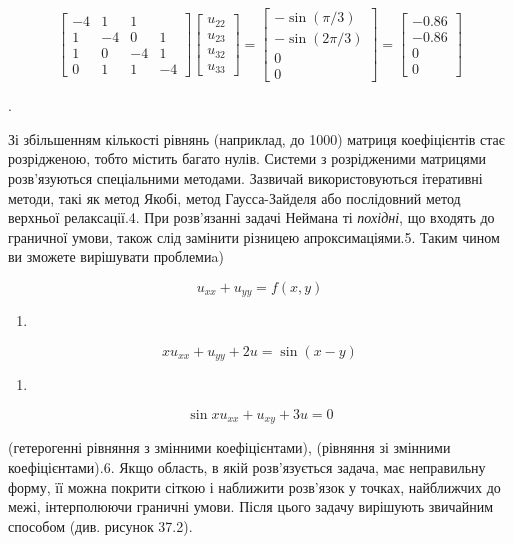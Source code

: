 \documentclass[
  ukrainian,
]{article}
\providecommand{\tightlist}{%
  \setlength{\itemsep}{0pt}\setlength{\parskip}{0pt}}
\begin{document}
\[
\begin{bmatrix} -4 & 1 & 1 \\ 1 & -4 & 0 & 1 \\ 1 & 0 & -4 & 1 \\ 0 & 1 & 1 & -4 \end{bmatrix}
\begin{bmatrix} u_{22} \\ u_{23} \\ u_{32} \\ u_{33} \end{bmatrix}
=
\begin{bmatrix} -\sin{(\pi/3)} \\ -\sin{(2\pi/3)} \\ 0 \\ 0 \end{bmatrix}
=
\begin{bmatrix} -0.86 \\ -0.86 \\ 0 \\ 0 \end{bmatrix}
\]

.

Зі збільшенням кількості рівнянь (наприклад, до 1000) матриця
коефіцієнтів стає розрідженою, тобто містить багато нулів. Системи з
розрідженими матрицями розв'язуються спеціальними методами. Зазвичай
використовуються ітеративні методи, такі як метод Якобі, метод
Гаусса-Зайделя або послідовний метод верхньої релаксації.4. При
розв'язанні задачі Неймана ті \emph{похідні}, що входять до граничної
умови, також слід замінити різницею апроксимаціями.5. Таким чином ви
зможете вирішувати проблемиa)

\[
u_{xx} + u_{yy} = f(x, y)
\]

\begin{enumerate}
\def\labelenumi{\arabic{enumi})}
\setcounter{enumi}{5}
\tightlist
\item
\end{enumerate}

\[
xu_{xx} + u_{yy} + 2u = \sin(x - y)
\]

\begin{enumerate}
\def\labelenumi{\Alph{enumi})}
\setcounter{enumi}{1}
\tightlist
\item
\end{enumerate}

\[
\sin xu_{xx} + u_{xy} + 3u = 0
\]

(гетерогенні рівняння з змінними коефіцієнтами), (рівняння зі змінними
коефіцієнтами).6. Якщо область, в якій розв'язується задача, має
неправильну форму, її можна покрити сіткою і наближити розв'язок у
точках, найближчих до межі, інтерполюючи граничні умови. Після цього
задачу вирішують звичайним способом (див. рисунок 37.2).
\end{document}
